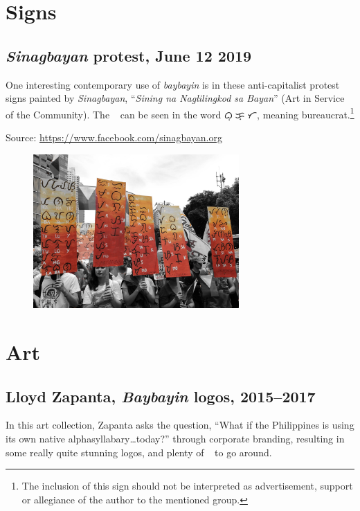 \documentclass[a4paper,pagesize,openany,14pt,parskip=never]{scrbook}
\newcommand{\≈}{$\approx$}
\newcommand{\ra}{{\baybayin ᜍ}}
\begin{document}
\section{Signs}

\subsection{{\em Sinagbayan} protest, June 12 2019}

One interesting contemporary use of {\em baybayin} is in these anti-capitalist protest signs painted by {\em Sinagbayan}, ``{\em Sining na Naglilingkod sa Bayan}'' (Art in Service of the Community). The \ra\ can be seen in the word {\baybayin ᜊᜓᜍᜓᜃ᜔ᜍᜆ}, meaning bureaucrat.\footnote{The inclusion of this sign should not be interpreted as advertisement, support or allegiance of the author to the mentioned group.}

Source: \url{https://www.facebook.com/sinagbayan.org}

\begin{figure}[H]
\includegraphics[width=0.7\textwidth]{Protest3}
\end{figure}

\section{Art}

\subsection{Lloyd Zapanta, {\em Baybayin} logos, 2015--2017}

In this art collection, Zapanta asks the question, ``What if the Philippines is using its own native alphasyllabary\ldots today?'' through corporate branding, resulting in some really quite stunning logos, and plenty of \ra\ to go around.
\end{document}
